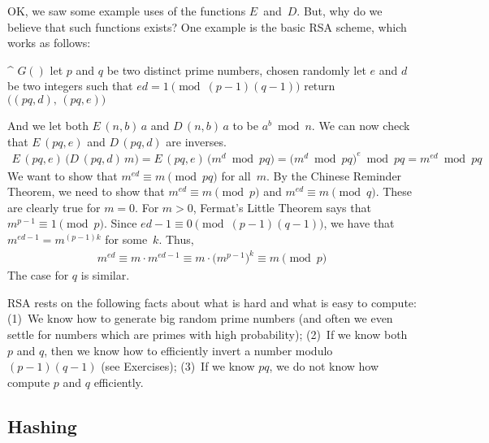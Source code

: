 OK, we saw some example uses of the functions $E$~and~$D$.
But, why do we believe that such functions exists?
One example is the basic RSA scheme, which works as follows:
\medskip
\begin{alg}
\^  $G()$
\0  let $p$ and $q$ be two distinct prime numbers, chosen randomly
\0  let $e$ and $d$ be two integers such that $ed = 1 \pmod{(p-1)(q-1)}$
\0  return $\bigl((pq,d),\, (pq,e)\bigr)$
\end{alg}
\medskip
\noindent
And we let both $E\,(n,b)\,a$ and $D\,(n,b)\,a$ to be $a^b \bmod n$.
We can now check that $E\,(pq,e)$ and $D\,(pq,d)$ are inverses.
\begin{align*}
E\,(pq,e)\,\bigl(D\,(pq,d)\,m\bigr)
  = E\,(pq,e)\,\bigl(m^d \bmod pq\bigr)
  = \bigl(m^d \bmod pq\bigr)^e \bmod pq
  = m^{ed} \bmod pq
\end{align*}
We want to show that $m^{ed}\equiv m \pmod{pq}$ for all~$m$.
By the Chinese Reminder Theorem, we need to show that $m^{ed} \equiv m \pmod{p}$ and $m^{ed} \equiv m \pmod{q}$.
These are clearly true for $m=0$.
For $m>0$, Fermat's Little Theorem says that $m^{p-1} \equiv 1 \pmod{p}$.
Since $ed-1 \equiv 0 \pmod{(p-1)(q-1)}$, we have that $m^{ed-1}=m^{(p-1)k}$ for some~$k$.
Thus,
\begin{align*}
m^{ed} \equiv m \cdot m^{ed-1} \equiv m \cdot \bigl(m^{p-1}\bigr)^k \equiv m
  \pmod{p}
\end{align*}
The case for $q$ is similar.

RSA rests on the following facts about what is hard and what is easy to compute:
(1)~We know how to generate big random prime numbers (and often we even settle for numbers which are primes with high probability);
(2)~If we know both $p$ and $q$, then we know how to efficiently invert a number modulo $(p-1)(q-1)$ (see Exercises);
(3)~If we know $pq$, we do not know how compute $p$ and $q$ efficiently.


\subsection{Hashing}\label{sec:bitcoin-hash}

